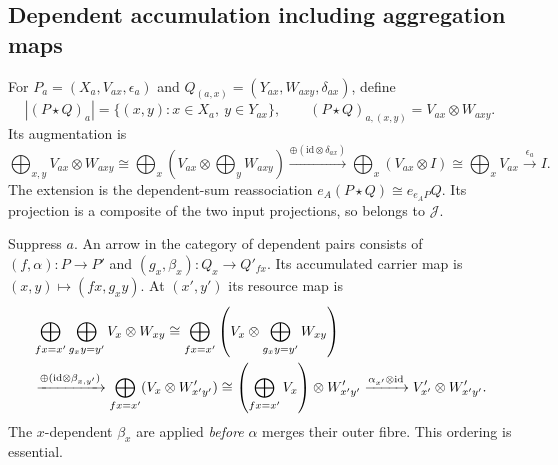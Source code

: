 \documentclass[11pt,a4paper]{article}
\theoremstyle{definition}
\newcommand{\J}{\mathcal J}
\newcommand{\id}{\mathrm{id}}
\newcommand{\starc}{\mathbin{\star}}
\begin{document}
\subsection{Dependent accumulation including aggregation maps}
For $P_a=(X_a,V_{ax},\epsilon_a)$ and
$Q_{(a,x)}=(Y_{ax},W_{axy},\delta_{ax})$, define
\[
 |(P\starc Q)_a|=\{(x,y):x\in X_a,\ y\in Y_{ax}\},\qquad
 (P\starc Q)_{a,(x,y)}=V_{ax}\otimes W_{axy}.
\]
Its augmentation is
\begin{equation}\label{eq:depaug}
 \bigoplus_{x,y}V_{ax}\otimes W_{axy}
 \cong\bigoplus_x\left(V_{ax}\otimes\bigoplus_yW_{axy}\right)
 \xrightarrow{\oplus(\id\otimes\delta_{ax})}
 \bigoplus_x(V_{ax}\otimes I)
 \cong\bigoplus_xV_{ax}\xrightarrow{\epsilon_a}I.
\end{equation}
The extension is the dependent-sum reassociation
$e_A(P\starc Q)\cong e_{e_AP}Q$. Its projection is a composite of the two
input projections, so belongs to $\J$.

Suppress $a$. An arrow in the category of dependent pairs consists of
$(f,\alpha):P\to P'$ and
$(g_x,\beta_x):Q_x\to Q'_{fx}$. Its accumulated carrier map is
$(x,y)\mapsto(fx,g_xy)$. At $(x',y')$ its resource map is
\begin{align}\label{eq:depmap}
 &\bigoplus_{fx=x'}\bigoplus_{g_xy=y'}V_x\otimes W_{xy}
 \cong\bigoplus_{fx=x'}\left(V_x\otimes
                  \bigoplus_{g_xy=y'}W_{xy}\right)\notag\\
 &\xrightarrow{\oplus(\id\otimes\beta_{x,y'})}
 \bigoplus_{fx=x'}(V_x\otimes W'_{x'y'})
 \cong\left(\bigoplus_{fx=x'}V_x\right)\otimes W'_{x'y'}
 \xrightarrow{\alpha_{x'}\otimes\id}V'_{x'}\otimes W'_{x'y'}.
\end{align}
The $x$-dependent $\beta_x$ are applied \emph{before} $\alpha$ merges their
outer fibre. This ordering is essential.
\end{document}
